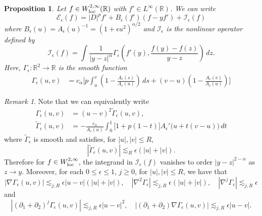 \documentclass[11pt]{amsart}
\newtheorem{proposition}[theorem]{Proposition}
\theoremstyle{definition}
\theoremstyle{remark}
\newtheorem{remark}[theorem]{Remark}
\numberwithin{equation}{section}
\newcommand{\sq}[1]{\widetilde{#1}}
\newcommand{\R}{\mathbb{R}}
\newcommand{\mc}[1]{\mathcal{#1}}
\begin{document}
\begin{proposition}\label{prop:analysis_semilinear_kernel}
    Let $f\in W^{2,\infty}_{\textup{loc}}(\R)$ with $f'\in L^\infty(\R)$. We can write
    \[\mc{E}_{\epsilon}(f) = |D|^p f' + B_\epsilon(f')\left(f-yf'\right) + \mc{I}_\epsilon(f)\]
    where $B_\epsilon(u)=A_\epsilon(u)^{-1}=(1+\epsilon u^2)^{\alpha/2}$ and $\mc{I}_\epsilon$ is the nonlinear operator defined by
    \[\mc{I}_\epsilon(f) = \int \frac{1}{|y - z|^\alpha} \Gamma_\epsilon\left(f'(y), \frac{f(y) - f(z)}{y - z} \right) \, dz.\]
    Here, $\Gamma_\epsilon: \R^2 \to \R$ is the smooth function
    \begin{equation}\label{eq:G_epsilon}
    \begin{aligned}
    \Gamma_\epsilon(u, v) & = c_\alpha\Bigg[p \int_u^v
    \left(1-\frac{A_\epsilon(s)}{A_\epsilon(u)}\right)\,ds + (v-u)\left(1-\frac{A_\epsilon(v)}{A_\epsilon(u)}\right)\Bigg] 
    \end{aligned}
    \end{equation}
\end{proposition}

\begin{remark}\label{rmk:analysis_vanishing_diagonal}
    Note that we can equivalently write
    \begin{equation}\label{eqn:analysis_kernel_quadratic_factor}
    \begin{aligned}
        \Gamma_\epsilon(u,v)&=(u-v)^2\sq{\Gamma}_\epsilon(u,v),\\
        \sq{\Gamma}_\epsilon(u,v)&=-\frac{c_\alpha}{A_\epsilon(u)}
        \int_0^1\bigl[1+p(1-t)\bigr]A_\epsilon'\bigl(u+t(v-u)\bigr)\,dt
    \end{aligned}
    \end{equation}
    where $\sq{\Gamma}_\epsilon$ is smooth and satisfies, for $|u|, |v| \leq R$,
    \[|\sq{\Gamma}_\epsilon(u, v)| \lesssim_{R} \epsilon (|u| + |v|).\]
    Therefore for $f \in W^{2, \infty}_{\textup{loc}}$, the integrand in $\mc{I}_\epsilon(f)$ vanishes to order $|y - z|^{2 - \alpha}$ as $z \to y$. Moreover, for each $0 \leq \epsilon \leq 1$, $j \geq 0$, for $|u|, |v| \leq R$, we have that 
    \begin{equation}\label{eqn:analysis_kernel_derivative_bounds}|\nabla \Gamma_\epsilon(u, v)| \lesssim_{j, R} \epsilon |u - v|(|u| + |v|), \quad |\nabla^2 \Gamma_\epsilon| \lesssim_{j, R} \epsilon(|u| + |v|), \quad |\nabla^j \Gamma_\epsilon| \lesssim_{j, R} \epsilon\end{equation}
    and 
    \begin{equation}\label{eqn:analysis_kernel_diagonal_derivative_bounds}|(\partial_1 + \partial_2)^j \Gamma_\epsilon(u, v)| \lesssim_{j, R} \epsilon|u - v|^2, \quad |(\partial_1 + \partial_2) \nabla \Gamma_\epsilon(u, v)| \lesssim_{j, R} \epsilon|u - v|.\end{equation}
\end{remark}
\end{document}
